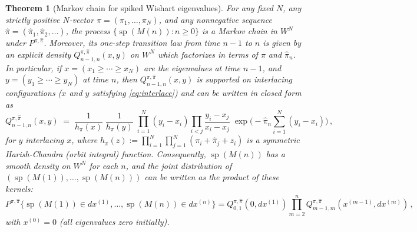 \documentclass[letterpaper,11pt,oneside,reqno]{article}
\numberwithin{equation}{section}
\newtheorem{theorem}[proposition]{Theorem}
\theoremstyle{definition}
\begin{document}
\begin{theorem}[Markov chain for spiked Wishart eigenvalues]\label{thm:MarkovChain}
For any fixed $N$, any strictly positive $N$-vector $\pi=(\pi_1,\dots,\pi_N)$, and any nonnegative sequence $\hat\pi=(\hat\pi_1,\hat\pi_2,\dots)$, the process $\{\operatorname{sp}(M(n)):n\ge0\}$ is a Markov chain in $W^N$ under $P^{\pi,\hat\pi}$. Moreover, its one-step transition law from time $n-1$ to $n$ is given by an explicit density $Q^{\pi,\hat\pi}_{n-1,n}(x, y)$ on $W^N$ which factorizes in terms of $\pi$ and $\hat\pi_n$. In particular, if $x=(x_1\ge\cdots\ge x_N)$ are the eigenvalues at time $n-1$, and $y=(y_1\ge\cdots\ge y_N)$ at time $n$, then $Q^{\pi,\hat\pi}_{n-1,n}(x, y)$ is supported on interlacing configurations ($x$ and $y$ satisfying \eqref{eq:interlace}) and can be written in closed form as
\begin{equation}\label{eq:transition-density}
Q^{\pi,\hat\pi}_{n-1,n}(x,y) \;=\; \frac{1}{\displaystyle h_\pi(x) } \; \frac{1}{\displaystyle h_\pi(y) } \; \prod_{i=1}^N (y_i - x_i) \prod_{i<j} \frac{y_i - x_j}{x_i - x_j}\; \exp\!\Big(-\hat\pi_n \sum_{i=1}^N (y_i - x_i)\Big)\,,
\end{equation}
for $y$ interlacing $x$, where $h_\pi(z) := \prod_{i=1}^N \prod_{j=1}^N (\pi_i + \hat\pi_j + z_i)$ is a symmetric Harish-Chandra (orbit integral) function.  Consequently, $\operatorname{sp}(M(n))$ has a smooth density on $W^N$ for each $n$, and the joint distribution of $(\operatorname{sp}(M(1)),\dots,\operatorname{sp}(M(n)))$ can be written as the product of these kernels:
\begin{equation}\label{eq:chain-factorization}
P^{\pi,\hat\pi}\{\operatorname{sp}(M(1))\in dx^{(1)}, \dots, \operatorname{sp}(M(n))\in dx^{(n)}\} = Q^{\pi,\hat\pi}_{0,1}(0, dx^{(1)}) \prod_{m=2}^n Q^{\pi,\hat\pi}_{m-1,m}(x^{(m-1)}, dx^{(m)})\,,
\end{equation}
with $x^{(0)}=0$ (all eigenvalues zero initially).
\end{theorem}
\end{document}
